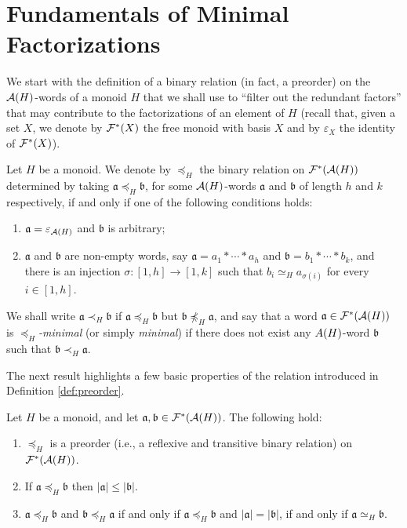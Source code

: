 \section{Fundamentals of Minimal Factorizations} \label{sec:minimal-factorizations}
We start with the definition of a binary relation (in fact, a preorder) on the $\mathcal{A}(H)$-words of a monoid $H$ that we shall use to ``filter out the redundant factors'' that may contribute to the factorizations of an element of $H$
(recall that, given a set $X$, we denote by $\mathcal{F}^\ast(X)$ the free monoid with basis $X$ and by $\varepsilon_X$ the identity of $\mathcal{F}^\ast(X)$).
%
\begin{defn}\label{def:preorder}
	Let $H$ be a monoid. We denote by $\preceq_H$ 
	the binary relation on $\mathcal{F}^\ast(\mathcal{A}(H))$ determined by taking $\mathfrak a \preceq_H \mathfrak b$, for some  
	$\mathcal{A}(H)$-words $\mathfrak a$ and $\mathfrak b$ of length $h$ and $k$ respectively, if and only if one of the following conditions holds:
	\begin{enumerate}[label=$\bullet$]
	\item $\mathfrak a = \varepsilon_{\mathcal{A}(H)}$ and $\mathfrak b$ is arbitrary;
	\item $\mathfrak a$ and $\mathfrak b$ are non-empty words, say $\mathfrak a = a_1 \ast \cdots \ast a_h$ and $\mathfrak b = b_1 \ast \cdots \ast b_k$, and
	there is an injection $\sigma: [ 1, h ] \to [ 1, k ]$ such that $b_i \simeq_H a_{\sigma(i)}$ for every $i \in [ 1, h ]$. 
	\end{enumerate}
	We shall write $\mathfrak{a} \prec_H \mathfrak{b}$ if $\mathfrak{a} \preceq_H \mathfrak{b}$ but $\mathfrak{b} \not\preceq_H \mathfrak{a}$, and say that a word $\mathfrak{a} \in \mathcal{F}^\ast(\mathcal{A}(H))$ is \emph{$\preceq_H$-minimal} (or simply \emph{minimal}) if there does not exist any $\\A(H)$-word $\mathfrak{b}$ such that $\mathfrak{b} \prec_H \mathfrak{a}$.
\end{defn}
%
The next result highlights a few basic properties of the relation introduced in Definition \ref{def:preorder}.
%
\begin{prop}\label{preorder-facts}
Let $H$ be a monoid, and let $\mathfrak{a},\mathfrak{b}\in \mathcal{F}^*(\mathcal{A}(H))$. The following hold:
\begin{enumerate}[label = {\textup{(\roman{*})}}]
%
\item\label{it:prop:preorder-facts(0)} $\preceq_H$ is a preorder \textup{(}i.e., a reflexive and transitive binary relation\textup{)} on $\mathcal{F}^\ast(\mathcal{A}(H))$.
%
\item\label{it:prop:preorder-facts(ii)} If $\mathfrak{a} \preceq_H \mathfrak{b}$ then $| \mathfrak{a} | \le | \mathfrak{b} |$.
%
\item\label{it:prop:preorder-facts(iv)} $\mathfrak{a} \preceq_H \mathfrak{b}$ and $\mathfrak{b} \preceq_H \mathfrak{a}$ if and only if $\mathfrak a \preceq_H \mathfrak b$ and $|\mathfrak a| = |\mathfrak b|$, if and only if $\mathfrak{a}\simeq_H\mathfrak{b}$.
\end{enumerate}
\end{prop}
